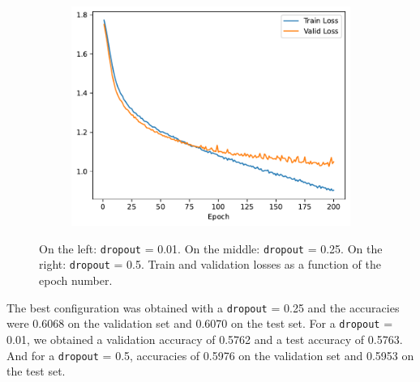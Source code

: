 \documentclass[a4paper, 12pt]{article}
\begin{document}
\begin{figure}[H]
\begin{subfigure}{0.30
    \textwidth}
        \label{fig:lr_0}
    \end{subfigure}
    \hfill
    \begin{subfigure}{0.30
    \textwidth}
        \includegraphics[width=\textwidth]{plot/mlp-training-loss-batch-64-lr-0.002-epochs-200-hidden-200-dropout-0.5-l2-0.0-layers-2-act-relu-opt-sgd-mom-0.0.pdf}
        \label{fig:lr_0.0}
    \end{subfigure}
    \vspace{-0.6cm}
    \caption{On the left: \texttt{dropout} = 0.01. On the middle: \texttt{dropout} = 0.25. On the right: \texttt{dropout} = 0.5. Train and validation losses as a function of the epoch number.}
    \label{fig:q}
\end{figure}


The best configuration was obtained with a \texttt{dropout} = 0.25 and the accuracies were 0.6068 on the validation set and 0.6070 on the test set. For a \texttt{dropout} = 0.01, we obtained a validation accuracy of 0.5762 and a test accuracy of 0.5763. And for a \texttt{dropout} = 0.5, accuracies of 0.5976 on the validation set and 0.5953 on the test set.
\end{document}
